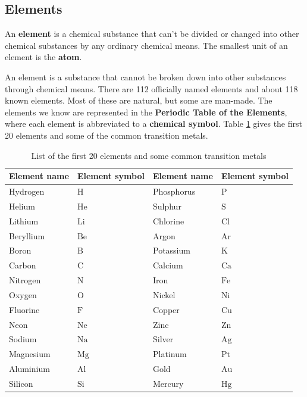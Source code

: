             \subsection*{Elements}
            \nopagebreak
        \label{m38708*id63302}An \textbf{element} is a chemical substance that can't be divided or changed into other chemical substances by any ordinary chemical means. The smallest unit of an element is the \textbf{atom}.\par 
\label{m38708*fhsst!!!underscore!!!id193}
{ \label{m38708*meaningfhsst!!!underscore!!!id193}
An element is a substance that cannot be broken down into other substances through chemical means.} 
        \label{m38708*id63334}There are 112 officially named elements and about 118 known elements. Most of these are natural, but some are man-made. The elements we know are represented in the \textbf{Periodic Table of the Elements}, where each element is abbreviated to a \textbf{chemical symbol}. Table \ref{tab:elements} gives the first 20 elements and some of the common transition metals.\par \label{m38708*eip-775}
\begin{table}[h!]
\label{tab:elements}
\begin{center}
\begin{tabular}{|l|l|l|l|}\hline
\textbf{Element name} & \textbf{Element symbol} & \textbf{Element name} & \textbf{Element symbol} \\ \hline
Hydrogen & $\mathrm{H}$ & Phosphorus & $\mathrm{P}$  \\ \hline
Helium & $\mathrm{He}$ & Sulphur & $\mathrm{S}$ \\ \hline
Lithium & $\mathrm{Li}$ & Chlorine & $\mathrm{Cl}$ \\ \hline
Beryllium & $\mathrm{Be}$ & Argon & $\mathrm{Ar}$ \\ \hline 
Boron & $\mathrm{B}$ & Potassium & $\mathrm{K}$ \\ \hline
Carbon & $\mathrm{C}$ & Calcium & $\mathrm{Ca}$ \\ \hline 
Nitrogen & $\mathrm{N}$ & Iron & $\mathrm{Fe}$ \\ \hline
Oxygen & $\mathrm{O}$ & Nickel & $\mathrm{Ni}$ \\ \hline 
Fluorine & $\mathrm{F}$ & Copper & $\mathrm{Cu}$ \\ \hline
Neon & $\mathrm{Ne}$  & Zinc & $\mathrm{Zn}$ \\ \hline
Sodium & $\mathrm{Na}$  & Silver & $\mathrm{Ag}$ \\ \hline
Magnesium & $\mathrm{Mg}$  & Platinum & $\mathrm{Pt}$ \\ \hline
Aluminium & $\mathrm{Al}$ & Gold & $\mathrm{Au}$ \\ \hline
Silicon & $\mathrm{Si}$ & Mercury & $\mathrm{Hg}$  \\ \hline
\end{tabular}
\end{center}
\caption{List of the first 20 elements and some common transition metals}
\end{table}

